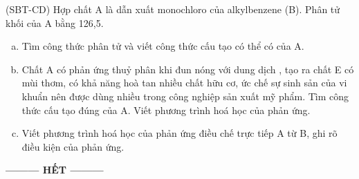\documentclass[12pt,a4paper]{article}
\begin{document}
\begin{ex}
(SBT-CD) Hợp chất A là dẫn xuất monochloro của alkylbenzene (B). Phân tử khối của A bằng 126,5.
\begin{enumerate}[a)]
    \item Tìm công thức phân tử và viết công thức cấu tạo có thể có của A.
    \item Chất A có phản ứng thuỷ phân khi đun nóng với dung dịch , tạo ra chất E có mùi thơm, có khả năng hoà tan nhiều chất hữu cơ, ức chế sự sinh sản của vi khuẩn nên được dùng nhiều trong công nghiệp sản xuất mỹ phẩm. Tìm công thức cấu tạo đúng của A. Viết phương trình hoá học của phản ứng.
    \item Viết phương trình hoá học của phản ứng điều chế trực tiếp A từ B, ghi rõ điều kiện của phản ứng.
\end{enumerate}

\vspace{4.0cm}

\end{ex}

\begin{center}
\textbf{--------- HẾT ---------}
\end{center}
\end{document}
